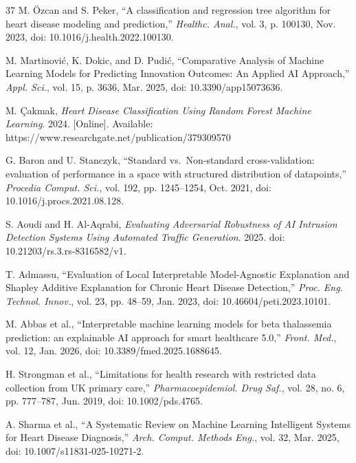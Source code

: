 \documentclass[conference]{IEEEtran}
\begin{document}
\begin{thebibliography}{37}
M. \"{O}zcan and S. Peker, ``A classification and regression tree algorithm for heart disease modeling and prediction,'' \textit{Healthc. Anal.}, vol. 3, p. 100130, Nov. 2023, doi: 10.1016/j.health.2022.100130.

M. Martinovi\'{c}, K. Dokic, and D. Pudi\'{c}, ``Comparative Analysis of Machine Learning Models for Predicting Innovation Outcomes: An Applied AI Approach,'' \textit{Appl. Sci.}, vol. 15, p. 3636, Mar. 2025, doi: 10.3390/app15073636.

M. \c{C}akmak, \textit{Heart Disease Classification Using Random Forest Machine Learning}. 2024. [Online]. Available: https://www.researchgate.net/publication/379309570

G. Baron and U. Stanczyk, ``Standard vs.\ Non-standard cross-validation: evaluation of performance in a space with structured distribution of datapoints,'' \textit{Procedia Comput. Sci.}, vol. 192, pp. 1245--1254, Oct. 2021, doi: 10.1016/j.procs.2021.08.128.

S. Aoudi and H. Al-Aqrabi, \textit{Evaluating Adversarial Robustness of AI Intrusion Detection Systems Using Automated Traffic Generation}. 2025. doi: 10.21203/rs.3.rs-8316582/v1.

T. Admassu, ``Evaluation of Local Interpretable Model-Agnostic Explanation and Shapley Additive Explanation for Chronic Heart Disease Detection,'' \textit{Proc. Eng. Technol. Innov.}, vol. 23, pp. 48--59, Jan. 2023, doi: 10.46604/peti.2023.10101.

M. Abbas et al., ``Interpretable machine learning models for beta thalassemia prediction: an explainable AI approach for smart healthcare 5.0,'' \textit{Front. Med.}, vol. 12, Jan. 2026, doi: 10.3389/fmed.2025.1688645.

H. Strongman et al., ``Limitations for health research with restricted data collection from UK primary care,'' \textit{Pharmacoepidemiol. Drug Saf.}, vol. 28, no. 6, pp. 777--787, Jun. 2019, doi: 10.1002/pds.4765.

A. Sharma et al., ``A Systematic Review on Machine Learning Intelligent Systems for Heart Disease Diagnosis,'' \textit{Arch. Comput. Methods Eng.}, vol. 32, Mar. 2025, doi: 10.1007/s11831-025-10271-2.

\end{thebibliography}
\end{document}
